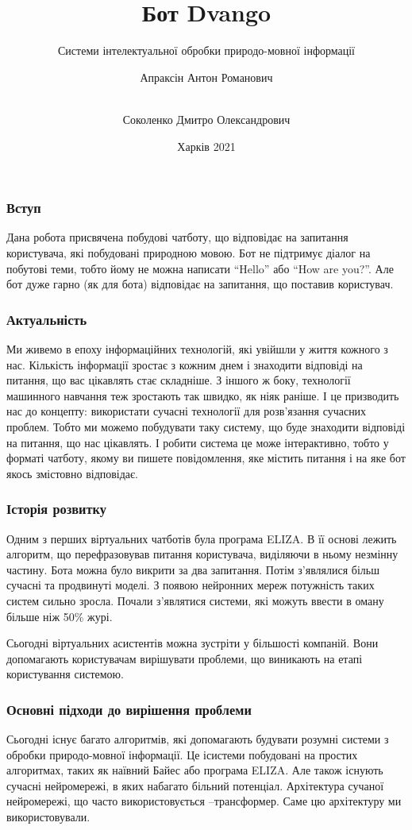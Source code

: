 \documentclass{beamer}
\title{Бот Dvango}
\subtitle{Системи інтелектуальної обробки природо-мовної інформації}
\author[Апраксін, Соколенко]{
    Апраксін Антон Романович
    \and\\
    Соколенко Дмитро Олександрович
}
\institute[ХНУРЕ]{ІТШІ-18-1}
\date{Харків 2021}
\begin{document}
    \frame{\titlepage}

    \begin{frame}
        \frametitle{Вступ}
            Дана робота присвячена побудові чатботу, що відповідає на запитання користувача, які побудовані природною мовою. Бот не підтримує діалог на побутові теми, тобто йому не можна написати ``Hello'' або ``How are you?''. Але бот дуже гарно (як для бота) відповідає на запитання, що поставив користувач.
    \end{frame}

    \begin{frame}
        \frametitle{Актуальність}
    Ми живемо в епоху інформаційних технологій, які увійшли у життя кожного з нас. Кількість інформації зростає з кожним днем і знаходити відповіді на питання, що вас цікавлять стає складніше. З іншого ж боку, технології машинного навчання теж зростають так швидко, як ніяк раніше. І це призводить нас до концепту: використати сучасні технології для розв'язання сучасних проблем. Тобто ми можемо побудувати таку систему, що буде знаходити відповіді на питання, що нас цікавлять. І робити система це може інтерактивно, тобто у форматі чатботу, якому ви пишете повідомлення, яке містить питання і на яке бот якось змістовно відповідає.
    \end{frame}

    \begin{frame}
        \frametitle{Історія розвитку}
        Одним з перших віртуальних чатботів була програма ELIZA. В її основі лежить алгоритм, що перефразовував питання користувача, виділяючи в ньому незмінну частину. Бота можна було викрити за два запитання. Потім з'являлися більш сучасні та продвинуті моделі. З появою нейронних мереж потужність таких систем сильно зросла. Почали з'являтися системи, які можуть ввести в оману більше ніж 50\% журі. 

        Сьогодні віртуальних асистентів можна зустріти у більшості компаній. Вони допомагають користувачам вирішувати проблеми, що виникають на етапі користування системою.
    \end{frame}

    \begin{frame}
        \frametitle{Основні підходи до вирішення проблеми}
        Сьогодні існує багато алгоритмів, які допомагають будувати розумні системи з обробки природо-мовної інформації. Це ісистеми побудовані на простих алгоритмах, таких як наївний Байес або програма ELIZA. Але також існують сучасні нейромережі, в яких набагато більний потенціал. Архітектура сучаної нейромережі, що часто використовується –трансформер. Саме цю архітектуру ми використовували.
    \end{frame}
\end{document}
